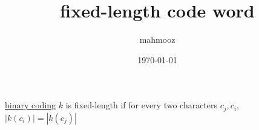 \documentclass[11pt]{article}
\author{mahmooz}
\date{\today}
\title{fixed-length code word}
\begin{document}
\maketitle
\tableofcontents

\begin{definition}
\href{20230119160930-binary_coding.org}{binary coding} \(k\) is fixed-length if for every two characters \(c_j,c_i\), \(|k(c_i)|=|k(c_j)|\)\\[0pt]
\end{definition}
\end{document}
